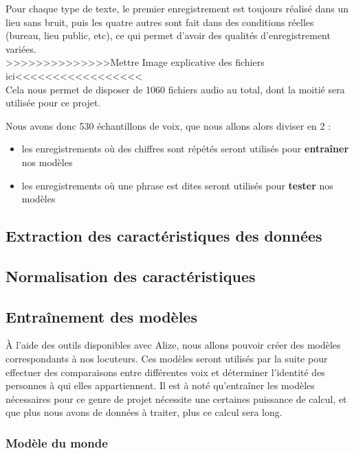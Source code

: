 \documentclass[a4paper, 12pt]{book}
\begin{document}
Pour chaque type de texte, le premier enregistrement est toujours réalisé dans un lieu sans bruit, puis les quatre autres sont fait dans des conditions réelles (bureau, lieu public, etc), ce qui permet d'avoir des qualités d'enregistrement variées.\\

>>>>>>>>>>>>>>Mettre Image explicative des fichiers ici<<<<<<<<<<<<<<<<<\\

Cela nous permet de disposer de 1060 fichiers audio au total, dont la moitié sera utilisée pour ce projet.

Nous avons donc 530 échantillons de voix, que nous allons alors diviser en 2 :
\begin{itemize}
  \item les enregistrements où des chiffres sont répétés seront utilisés pour \textbf{entraîner} nos modèles
  \item les enregistrements où une phrase est dites seront utilisés pour \textbf{tester} nos modèles
\end{itemize}

\subsection{Extraction des caractéristiques des données}

\subsection{Normalisation des caractéristiques}

\subsection{Entraînement des modèles}

À l'aide des outils disponibles avec Alize, nous allons pouvoir créer des modèles correspondants à nos locuteurs. Ces modèles seront utilisés par la suite pour effectuer des comparaisons entre différentes voix et déterminer l'identité des personnes à qui elles appartiennent. Il est à noté qu'entraîner les modèles nécessaires pour ce genre de projet nécessite une certaines puissance de calcul, et que plus nous avons de données à traiter, plus ce calcul sera long.

\subsubsection{Modèle du monde}
\end{document}
